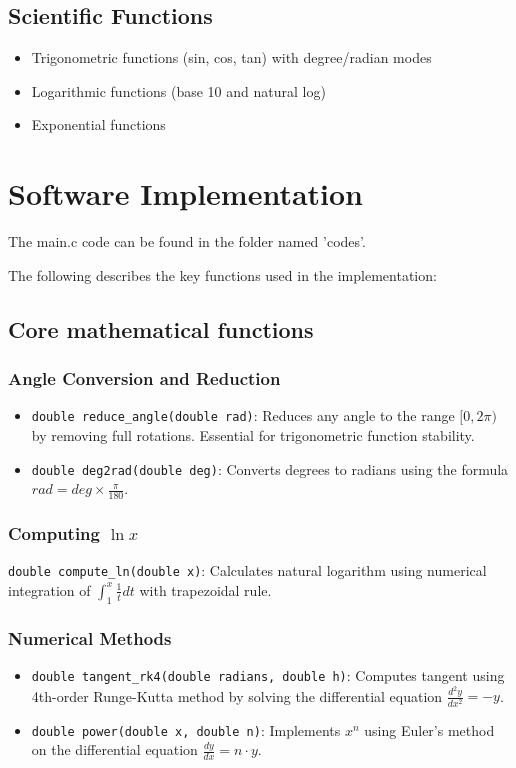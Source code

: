 \documentclass[journal]{IEEEtran}
\begin{document}
\subsection{Scientific Functions}
\begin{itemize}
    \item Trigonometric functions (sin, cos, tan) with degree/radian modes
    \item Logarithmic functions (base 10 and natural log)
    \item Exponential functions
\end{itemize}


\section{Software Implementation}

The main.c code can be found in the folder named 'codes'.

The following describes the key functions used in the implementation:
\subsection{Core mathematical functions}


\subsubsection{Angle Conversion and Reduction}
\begin{itemize}
\item \texttt{double reduce\_angle(double rad)}:
Reduces any angle to the range $[0, 2\pi)$ by removing full rotations. Essential for trigonometric function stability.

\item \texttt{double deg2rad(double deg)}:
Converts degrees to radians using the formula $rad = deg \times \frac{\pi}{180}$.
\end{itemize}
\subsubsection{Computing $\ln{x}$}
\texttt{double compute\_ln(double x)}:
Calculates natural logarithm using numerical integration of $\int_1^x \frac{1}{t} dt$ with trapezoidal rule.
\subsubsection{Numerical Methods}
\begin{itemize}
\item \texttt{double tangent\_rk4(double radians, double h)}:
Computes tangent using 4th-order Runge-Kutta method by solving the differential equation $\frac{d^2y}{dx^2} = -y$.
\item \texttt{double power(double x, double n)}:
Implements $x^n$ using Euler's method on the differential equation $\frac{dy}{dx} = n \cdot y$.
\end{itemize}
\end{document}
